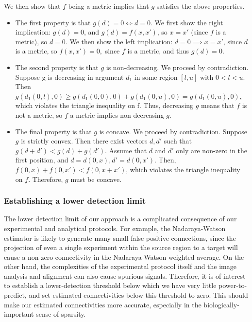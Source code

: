 We then show that $f$ being a metric implies that $g$ satisfies the above properties.
\begin{itemize}
    \item The first property is that $g(d) = 0 \Longleftrightarrow d = 0$. We first show the right implication: $g(d) = 0$, and $g(d) = f(x,x')$, so $x = x'$ (since $f$ is a metric), so $d = 0$. We then show the left implication: $d = 0 \implies x = x'$, since $d$ is a metric, so $f(x,x') = 0,$ since $f$ is a metric, and thus $g(d) = 0$.
    \item The second property is that $g$ is non-decreasing. We proceed by contradiction.
    Suppose g is decreasing in argument $d_1$ in some region $[l, u]$ with $0 < l< u$.
    Then $g(d_1(0, l), 0) \geq g(d_1(0, 0), 0) + g(d_1(0, u), 0) = g(d_1(0, u),0)$, which violates the triangle inequality on f. Thus, decreasing $g$ means that $f$ is not a metric, so $f$ a metric implies non-decreasing $g$.
    \item The final property is that $g$ is concave. We proceed by contradiction. Suppose $g$ is strictly convex. Then there exist vectors $d, d'$ such that $g(d + d')  < g(d) + g(d')$.  Assume that $d$ and $d'$ only are non-zero in the first position, and $d = d(0, x), d' = d(0,x')$.  Then, $f(0,x) + f(0,x') <  f(0,x+ x')$, which violates the triangle inequality on $f$.  Therefore, $g$ must be concave.
\end{itemize}

\subsubsection{Establishing a lower detection limit}
\label{supp:methods_lower}

The lower detection limit of our approach is a complicated consequence of our experimental and analytical protocols.
For example, the Nadaraya-Watson estimator is likely to generate many small false positive connections, since the projection of even a single experiment within the source region to a target will cause a non-zero connectivity in the Nadaraya-Watson weighted average.
On the other hand, the complexities of the experimental protocol itself and the image analysis and alignment can also cause spurious signals.
Therefore, it is of interest to establish a lower-detection threshold below which we have very little power-to-predict, and set estimated connectivities below this threshold to zero.
This should make our estimated connectivities more accurate, especially in the biologically-important sense of sparsity.

